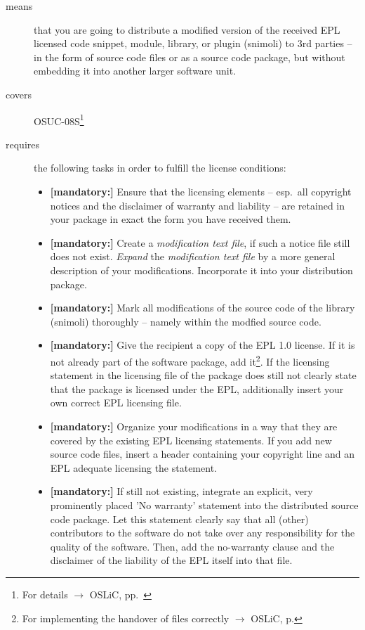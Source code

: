 \begin{description}
\item[means] that you are going to distribute a modified version of the received
EPL licensed code snippet, module, library, or plugin (snimoli) to 3rd parties
-- in the form of source code files or as a source code package, but without
embedding it into another larger software unit.
\item[covers] OSUC-08S\footnote{For details $\rightarrow$ OSLiC, pp.\
\pageref{OSUC-08S-DEF}} 
\item[]
\item[requires] the following tasks in order to fulfill the license conditions:
\begin{itemize}

  \item \textbf{[mandatory:]} Ensure that the licensing elements -- esp.\ all
  copyright notices and the disclaimer of warranty and liability -- are retained
  in your package in exact the form you have received them.

  \item \textbf{[mandatory:]} Create a \emph{modification text file}, if such a
  notice file still does not exist. \emph{Expand} the \emph{modification text
  file} by a more general description of your modifications. Incorporate it into
  your distribution package.

  \item \textbf{[mandatory:]} Mark all modifications of the source code of the
  library (snimoli) thoroughly -- namely within
  the modfied source code.
  
  \item \textbf{[mandatory:]} Give the recipient a copy of the EPL 1.0 license.
  If it is not already part of the software package, add it\footnote{For
  implementing the handover of files correctly $\rightarrow$ OSLiC, p.
  \pageref{DistributingFilesHint}}. If the licensing statement in the licensing
  file of the package does still not clearly state that the package is licensed
  under the EPL, additionally insert your own correct EPL licensing file.
  
  \item \textbf{[mandatory:]} Organize your modifications in a way that they are
  covered by the existing EPL licensing statements. If you add new source code
  files, insert a header containing your copyright line and an EPL adequate
  licensing the statement.
  
  \item \textbf{[mandatory:]} If still not existing, integrate an explicit, very
  prominently placed 'No warranty' statement into the distributed source code
  package. Let this statement clearly say that all (other) contributors to the
  software do not take over any responsibility for the quality of the software.
  Then, add the no-warranty clause and the disclaimer of the liability of the
  EPL itself into that file.
  

\end{itemize}
\end{description}
